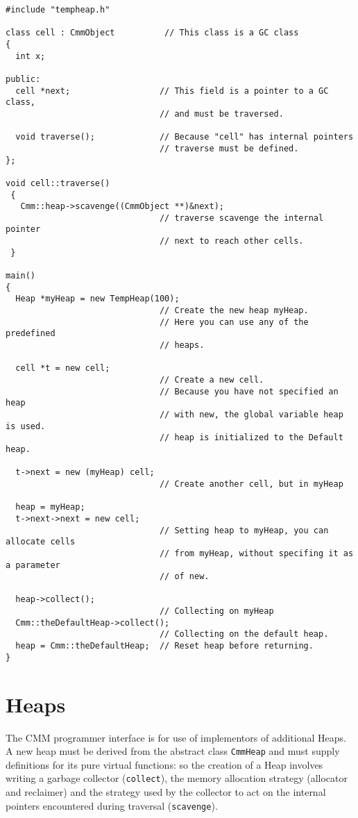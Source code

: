\begin{verbatim}
#include "tempheap.h"

class cell : CmmObject          // This class is a GC class
{
  int x;

public: 
  cell *next;                  // This field is a pointer to a GC class,
                               // and must be traversed.

  void traverse();             // Because "cell" has internal pointers
                               // traverse must be defined.
};

void cell::traverse()
 { 
   Cmm::heap->scavenge((CmmObject **)&next); 
                               // traverse scavenge the internal pointer
                               // next to reach other cells.
 }

main()
{
  Heap *myHeap = new TempHeap(100);
                               // Create the new heap myHeap.
                               // Here you can use any of the predefined
                               // heaps.

  cell *t = new cell;
                               // Create a new cell. 
                               // Because you have not specified an heap
                               // with new, the global variable heap is used.
                               // heap is initialized to the Default heap.

  t->next = new (myHeap) cell;
                               // Create another cell, but in myHeap

  heap = myHeap;
  t->next->next = new cell;
                               // Setting heap to myHeap, you can allocate cells
                               // from myHeap, without specifing it as a parameter
                               // of new.

  heap->collect();
                               // Collecting on myHeap
  Cmm::theDefaultHeap->collect();
                               // Collecting on the default heap.
  heap = Cmm::theDefaultHeap;  // Reset heap before returning.
}
\end{verbatim}

\section{Heaps}

The CMM programmer interface is for use of implementors of additional Heaps. A
new heap must be derived from the abstract class {\tt CmmHeap} and must supply
definitions for its pure virtual functions: so the creation of a Heap involves
writing a garbage collector ({\tt collect}), the memory allocation strategy
(allocator and reclaimer) and the strategy used by the collector to act on the
internal pointers encountered during traversal ({\tt scavenge}).

